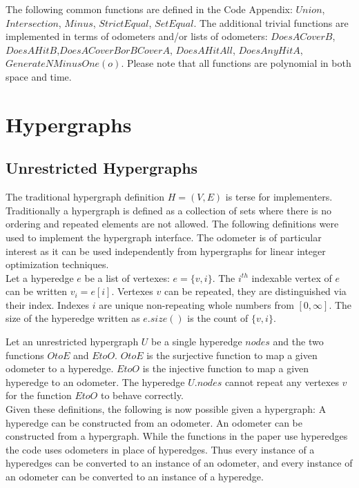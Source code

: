 The following common functions are defined in the Code Appendix: $Union$, $Intersection$, $Minus$, $StrictEqual$, $SetEqual$. The additional trivial functions are implemented in terms of odometers and/or lists of odometers: $DoesACoverB$, $DoesAHitB$,$DoesACoverBorBCoverA$, $DoesAHitAll$, $DoesAnyHitA$, $GenerateNMinusOne(o)$. Please note that all functions are polynomial in both space and time.\\

\section{Hypergraphs}
\subsection{Unrestricted Hypergraphs}
The traditional hypergraph definition $H=(V,E)$ is terse for implementers. Traditionally a hypergraph is defined as a collection of sets where there is no ordering and repeated elements are not allowed. The following definitions were used  to implement the hypergraph interface. The odometer is of particular interest as it can be used independently from hypergraphs for linear integer optimization techniques.\\

Let a hyperedge $e$ be a list of vertexes: $e =\{v,i\}$. The $i^{th}$ indexable vertex of $e$ can be written $v_i = e[i]$. Vertexes $v$ can be repeated, they are distinguished via their index. Indexes $i$ are unique non-repeating whole numbers from $[0,\infty]$. The size of the hyperedge written as $e.size()$ is the count of $\{v,i\}$.


Let an unrestricted hypergraph $U$ be a single hyperedge $nodes$ and the two functions $OtoE$ and $EtoO$. $OtoE$ is the surjective function to map a given odometer to a hyperedge. $EtoO$ is the injective function to map a given hyperedge to an odometer. The hyperedge $U.nodes$ cannot repeat any vertexes $v$ for the function $EtoO$ to behave correctly. \\

Given these definitions, the following is now possible given a hypergraph: A hyperedge can be constructed from an odometer. An odometer can be constructed from a hypergraph. While the functions in the paper use hyperedges the code uses odometers in place of hyperedges. Thus every instance of a hyperedges can be converted to an instance of an odometer, and every instance of an odometer can be converted to an instance of a hyperedge.\\

